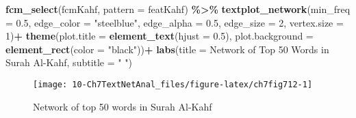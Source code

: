 \documentclass[
]{article}
\newenvironment{Shaded}{\begin{snugshade}}{\end{snugshade}}
\newcommand{\AttributeTok}[1]{\textcolor[rgb]{0.13,0.29,0.53}{#1}}
\newcommand{\DecValTok}[1]{\textcolor[rgb]{0.00,0.00,0.81}{#1}}
\newcommand{\FloatTok}[1]{\textcolor[rgb]{0.00,0.00,0.81}{#1}}
\newcommand{\FunctionTok}[1]{\textcolor[rgb]{0.13,0.29,0.53}{\textbf{#1}}}
\newcommand{\NormalTok}[1]{#1}
\newcommand{\SpecialCharTok}[1]{\textcolor[rgb]{0.81,0.36,0.00}{\textbf{#1}}}
\newcommand{\StringTok}[1]{\textcolor[rgb]{0.31,0.60,0.02}{#1}}
\begin{document}
\begin{Shaded}
\begin{Highlighting}[]
\FunctionTok{fcm\_select}\NormalTok{(fcmKahf, }\AttributeTok{pattern =}\NormalTok{ featKahf) }\SpecialCharTok{\%\textgreater{}\%}
    \FunctionTok{textplot\_network}\NormalTok{(}\AttributeTok{min\_freq =} \FloatTok{0.5}\NormalTok{, }
                     \AttributeTok{edge\_color =} \StringTok{"steelblue"}\NormalTok{, }
                     \AttributeTok{edge\_alpha =} \FloatTok{0.5}\NormalTok{, }
                     \AttributeTok{edge\_size =} \DecValTok{2}\NormalTok{,}
                     \AttributeTok{vertex.size =} \DecValTok{1}\NormalTok{)}\SpecialCharTok{+}
  \FunctionTok{theme}\NormalTok{(}\AttributeTok{plot.title =} \FunctionTok{element\_text}\NormalTok{(}\AttributeTok{hjust =} \FloatTok{0.5}\NormalTok{),}
        \AttributeTok{plot.background =} \FunctionTok{element\_rect}\NormalTok{(}\AttributeTok{color =} \StringTok{"black"}\NormalTok{))}\SpecialCharTok{+}
  \FunctionTok{labs}\NormalTok{(}\AttributeTok{title =} \StringTok{\textquotesingle{}Network of Top 50 Words in Surah Al{-}Kahf\textquotesingle{}}\NormalTok{,}
       \AttributeTok{subtitle =} \StringTok{" "}\NormalTok{)}
\end{Highlighting}
\end{Shaded}

\begin{figure}

{\centering \texttt{[image: 10-Ch7TextNetAnal\_files/figure-latex/ch7fig712-1]} 

}

\caption{Network of top 50 words in Surah Al-Kahf}\label{fig:ch7fig712}
\end{figure}
\end{document}
